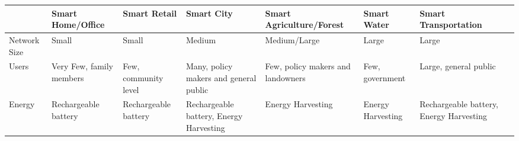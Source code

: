 \begin{landscape}
  \begin{table}[p]
    \centering
    \begin{adjustbox}{width=\textwidth}
      \begin{tabular}{*{14}{l}}
      \toprule
      ~                      & \multicolumn{2}{l}{Smart Home/Office}                                  & \multicolumn{2}{l}{Smart Retail}                                       & \multicolumn{2}{l}{Smart City}                                                      & \multicolumn{2}{l}{Smart Agriculture/Forest}                                  & \multicolumn{2}{l}{Smart Water}                                                              & \multicolumn{2}{l}{Smart Transportation}                                             \\
      \midrule
      Network Size           & \multicolumn{2}{p{\colWidth}}{\raggedright Small}                      & \multicolumn{2}{p{\colWidth}}{\raggedright Small}                      & \multicolumn{2}{p{\colWidth}}{\raggedright Medium}                                  & \multicolumn{2}{p{\colWidth}}{\raggedright Medium/Large}                      & \multicolumn{2}{p{\colWidth}}{\raggedright Large}                                            & \multicolumn{2}{p{\colWidth}}{\raggedright Large}                                    \\
      Users                  & \multicolumn{2}{p{\colWidth}}{\raggedright Very Few, family members}   & \multicolumn{2}{p{\colWidth}}{\raggedright Few, community level}       & \multicolumn{2}{p{\colWidth}}{\raggedright Many, policy makers and general public}  & \multicolumn{2}{p{\colWidth}}{\raggedright Few, policy makers and landowners} & \multicolumn{2}{p{\colWidth}}{\raggedright Few, government}                                  & \multicolumn{2}{p{\colWidth}}{\raggedright Large, general public}                    \\
      Energy                 & \multicolumn{2}{p{\colWidth}}{\raggedright Rechargeable battery}       & \multicolumn{2}{p{\colWidth}}{\raggedright Rechargeable battery}       & \multicolumn{2}{p{\colWidth}}{\raggedright Rechargeable battery, Energy Harvesting} & \multicolumn{2}{p{\colWidth}}{\raggedright Energy Harvesting}                 & \multicolumn{2}{p{\colWidth}}{\raggedright Energy Harvesting}                                & \multicolumn{2}{p{\colWidth}}{\raggedright Rechargeable battery, Energy Harvesting}  \\

\end{tabular}
\end{adjustbox}
\end{table}
\end{landscape}
